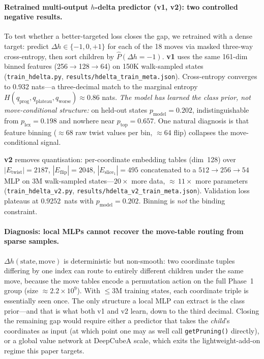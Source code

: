 \documentclass[graybox]{svmult}
\begin{document}
\paragraph{Retrained multi-output $h$-delta predictor (v1, v2): two controlled negative results.}
\begin{sloppypar}
To test whether a better-targeted loss closes the gap, we retrained with a dense target: predict $\Delta h \in \{-1,0,+1\}$ for each of the 18 moves via masked three-way cross-entropy, then sort children by $\hat P(\Delta h {=} -1)$. \textbf{v1} uses the same 161-dim binned features (256$\to$128$\to$64) on 150K walk-sampled states (\texttt{train\_hdelta.py}, \texttt{results/\allowbreak hdelta\_train\_meta.json}). Cross-entropy converges to $0.932$ nats---a three-decimal match to the marginal entropy $H(q_{\text{prog}}, q_{\text{plateau}}, q_{\text{worse}}) \approx 0.86$ nats. \emph{The model has learned the class prior, not move-conditional structure:} on held-out states $p_{\text{model}} = 0.202$, indistinguishable from $p_{\text{lex}} = 0.198$ and nowhere near $p_{\text{top}} = 0.657$. One natural diagnosis is that feature binning ($\approx$68 raw twist values per bin, $\approx$64 flip) collapses the move-conditional signal.

\textbf{v2} removes quantisation: per-coordinate embedding tables (dim~128) over $|E_{\text{twist}}|{=}2187$, $|E_{\text{flip}}|{=}2048$, $|E_{\text{slice}_1}|{=}495$ concatenated to a $512{\to}256{\to}54$ MLP on $3$M walk-sampled states---$20\times$ more data, $\approx$\,$11\times$ more parameters (\texttt{train\_hdelta\_v2.py}, \texttt{results/\allowbreak hdelta\_v2\_\allowbreak train\_meta.json}). Validation loss plateaus at $0.9252$~nats with $p_{\text{model}} = 0.202$. Binning is \emph{not} the binding constraint.
\end{sloppypar}

\paragraph{Diagnosis: local MLPs cannot recover the move-table routing from sparse samples.}
$\Delta h(\text{state}, \text{move})$ is deterministic but non-smooth: two coordinate tuples differing by one index can route to entirely different children under the same move, because the move tables encode a permutation action on the full Phase~1 group (size $\approx$$2.2{\times}10^9$). With $\leq$$3$M training states, each coordinate triple is essentially seen once. The only structure a local MLP can extract is the class prior---and that is what both v1 and v2 learn, down to the third decimal. Closing the remaining gap would require either a predictor that takes the \emph{child}'s coordinates as input (at which point one may as well call \texttt{getPruning()} directly), or a global value network at DeepCubeA scale, which exits the lightweight-add-on regime this paper targets.
\end{document}
